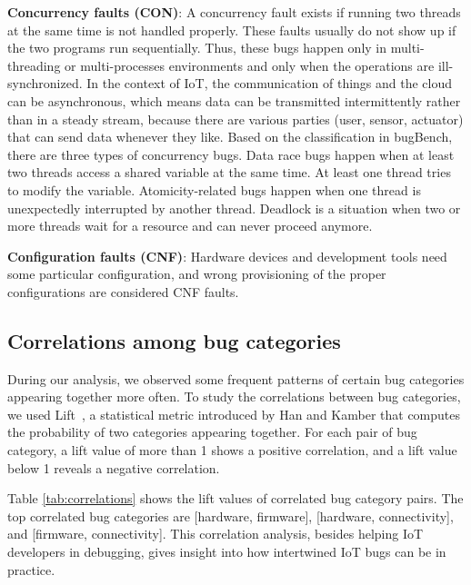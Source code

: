 \textbf{Concurrency faults (CON)}: A concurrency fault exists if running two threads at the same time is not handled properly. These faults usually do not show up if the two programs run sequentially. Thus, these bugs happen only in multi-threading or multi-processes environments and only when the operations are ill-synchronized. In the context of IoT, the communication of things and the cloud can be asynchronous, which means data can be transmitted intermittently rather than in a steady stream, because there are various parties (user, sensor, actuator) that can send data whenever they like. Based on the classification in bugBench, there are three types of concurrency bugs. Data race bugs happen when at least two threads access a shared variable at the same time. At least one thread tries to modify the variable. Atomicity-related bugs happen when one thread is unexpectedly interrupted by another thread. Deadlock is a situation when two or more threads wait for a resource and can never proceed anymore. 


\textbf{Configuration faults (CNF)}: Hardware devices and development tools need some particular configuration, and wrong provisioning of the proper configurations are considered CNF faults.


\subsection{Correlations among bug categories}
During our analysis, we observed some frequent patterns of certain bug categories appearing together more often. To study the correlations between bug categories, we used Lift~\cite{kamber2001data}, a statistical metric introduced by Han and Kamber that computes the probability of two categories appearing together. For each pair of bug category, a lift value of more than 1 shows a positive correlation, and a lift value below 1 reveals a negative correlation. 

Table \ref{tab:correlations} shows the lift values of correlated bug category pairs. The top correlated bug categories are [hardware, firmware], [hardware, connectivity], and [firmware, connectivity]. This correlation analysis, besides helping IoT developers in debugging, gives insight into how intertwined IoT bugs can be in practice.


